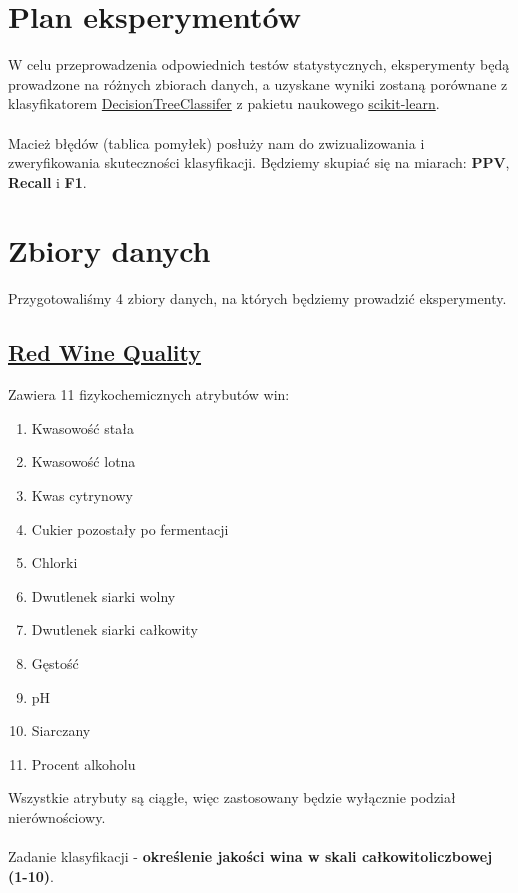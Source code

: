 \documentclass[11pt]{article}
\begin{document}
\section{Plan eksperymentów}
\label{sec:orgba831bb}
W celu przeprowadzenia odpowiednich testów statystycznych, eksperymenty będą prowadzone na różnych zbiorach danych, a uzyskane wyniki zostaną porównane z klasyfikatorem \href{https://scikit-learn.org/stable/modules/generated/sklearn.tree.DecisionTreeClassifier.html\#decisiontreeclassifier}{DecisionTreeClassifer} z pakietu naukowego \href{https://scikit-learn.org}{scikit-learn}.
\\\\
Macież błędów (tablica pomyłek) posłuży nam do zwizualizowania i zweryfikowania skuteczności klasyfikacji. Będziemy skupiać się na miarach: \textbf{PPV}, \textbf{Recall} i \textbf{F1}.

\section{Zbiory danych}
\label{sec:org34135ba}
Przygotowaliśmy 4 zbiory danych, na których będziemy prowadzić eksperymenty.
\subsection{\href{https://www.kaggle.com/datasets/uciml/red-wine-quality-cortez-et-al-2009/data}{Red Wine Quality}}
\label{sec:orge712876}
Zawiera 11 fizykochemicznych atrybutów win:
\begin{enumerate}
\item Kwasowość stała
\item Kwasowość lotna
\item Kwas cytrynowy
\item Cukier pozostały po fermentacji
\item Chlorki
\item Dwutlenek siarki wolny
\item Dwutlenek siarki całkowity
\item Gęstość
\item pH
\item Siarczany
\item Procent alkoholu
\end{enumerate}
Wszystkie atrybuty są ciągłe, więc zastosowany będzie wyłącznie podział nierównościowy.
\\\\
Zadanie klasyfikacji - \textbf{określenie jakości wina w skali całkowitoliczbowej (1-10)}.
\end{document}
